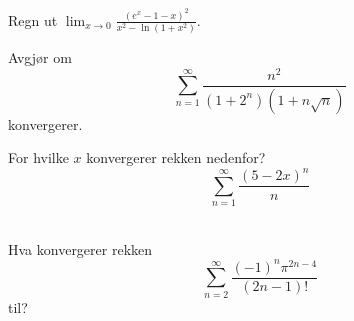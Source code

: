 \documentclass[a4paper,norsk,11pt]{interaktiv}
\begin{document}
\begin{oppgave}{5}
  Regn ut $\displaystyle\lim_{x\to 0}
  \frac{(e^x-1-x)^2}{x^2-\ln(1+x^2)}$.
  \\[-6pt]
\end{oppgave}

\begin{oppgave}{6}
  Avgjør om
  \begin{equation*}
    \sum_{n=1}^{\infty}\frac{n^2}{(1+2^n)(1+n\sqrt{n})}
  \end{equation*}
  konvergerer.
  \\[-6pt]
\end{oppgave}

\begin{oppgave}{7}
  For hvilke $x$ konvergerer rekken nedenfor?
  \begin{equation*}
    \sum_{n=1}^{\infty}\frac{(5-2x)^n}{n}
  \end{equation*}
  \\[-6pt]
\end{oppgave}

\begin{oppgave}{8}
  Hva konvergerer rekken
  \begin{equation*}
    \sum_{n=2}^{\infty}\frac{(-1)^n\pi^{2n-4}}{(2n-1)!}
  \end{equation*}
  til?
  \\[-6pt]
\end{oppgave}
\end{document}
